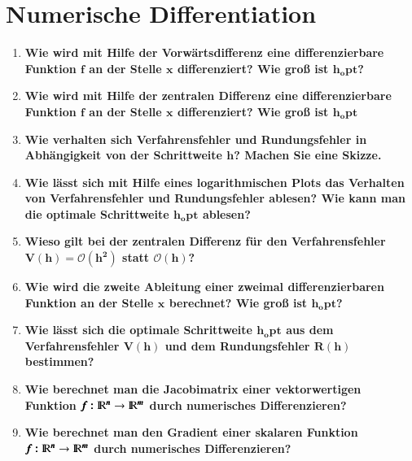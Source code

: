\documentclass[10pt,a4paper]{article}
\begin{document}
	\section{Numerische Differentiation}
	\begin{enumerate}
		\item \textbf{Wie wird mit Hilfe der Vorwärtsdifferenz eine differenzierbare Funktion $\pmb{f}$ an der Stelle $\pmb{x}$ differenziert? Wie groß ist $\pmb{h_opt}$?}\\
		\item \textbf{Wie wird mit Hilfe der zentralen Differenz eine differenzierbare Funktion $\pmb{f}$ an der Stelle $\pmb{x}$ differenziert? Wie groß ist $\pmb{h_opt}$}\\
		\item \textbf{Wie verhalten sich Verfahrensfehler und Rundungsfehler in Abhängigkeit von der Schrittweite $\pmb{h}$? Machen Sie eine Skizze.}\\
		\item \textbf{Wie lässt sich mit Hilfe eines logarithmischen Plots das Verhalten von Verfahrensfehler und Rundungsfehler ablesen? Wie kann man die optimale Schrittweite $\pmb{h_opt}$ ablesen?}\\
		\item \textbf{Wieso gilt bei der zentralen Differenz für den Verfahrensfehler $\pmb{V(h)=\mathcal{O}(h^2)}$ statt $\pmb{\mathcal{O}(h)}$?}\\
		\item \textbf{Wie wird die zweite Ableitung einer zweimal differenzierbaren Funktion an der Stelle $\pmb{x}$ berechnet? Wie groß ist $\pmb{h_opt}$?}\\
		\item \textbf{Wie lässt sich die optimale Schrittweite $\pmb{h_opt}$ aus dem Verfahrensfehler $\pmb{V(h)}$ und dem Rundungsfehler $\pmb{R(h)}$ bestimmen?}\\
		\item \textbf{Wie berechnet man die Jacobimatrix einer vektorwertigen Funktion $\pmb{f:}{\rm I\!R}\pmb{^n} \rightarrow {\rm I\!R}\pmb{^m}$ durch numerisches Differenzieren?}\\
		\item \textbf{Wie berechnet man den Gradient einer skalaren Funktion $\pmb{f:}{\rm I\!R}\pmb{^n} \rightarrow {\rm I\!R}\pmb{^m}$ durch numerisches Differenzieren?}\\
	\end{enumerate}

	\newpage
\end{document}
